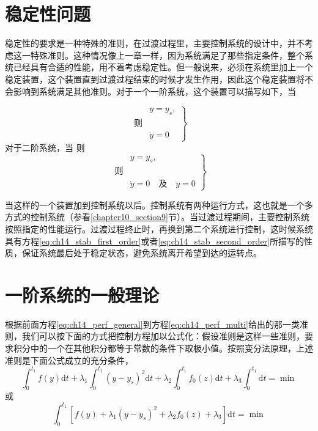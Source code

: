 \section{稳定性问题}

稳定性的要求是一种特殊的准则，在过渡过程里，主要控制系统的设计中，并不考虑这一特殊准则。这种情况像上一章一样，因为系统满足了那些指定条件，整个系统已经具有合适的性能，用不着考虑稳定性。但一般说来，必须在系统里加上一个稳定装置，这个装置直到过渡过程结束的时候才发生作用，因此这个稳定装置将不会影响到系统满足其他准则。对于一个一阶系统，这个装置可以描写如下，当

\begin{equation}
\left.
\begin{aligned}
&y = y_s, \\
\mbox{则}&\\
&\dot{y} = 0
\end{aligned}
\right\}
\label{eq:ch14_stab_first_order}
\end{equation}
对于二阶系统，当
则
\begin{equation}
\left.
\begin{aligned}
&y = y_s, \\
\mbox{则}&\\
&\dot{y} = 0 \quad \text{及} \quad \ddot{y} = 0
\end{aligned}
\right\}
\label{eq:ch14_stab_second_order}
\end{equation}

当这样的一个装置加到控制系统以后。控制系统有两种运行方式，这也就是一个多方式的控制系统（参看\ref{chapter10_section9}节）。当过渡过程期间，主要控制系统按照指定的性能运行。过渡过程终止时，再换到第二个系统进行控制，这时候系统具有方程\eqref{eq:ch14_stab_first_order}或者\eqref{eq:ch14_stab_second_order}所描写的性质，保证系统最后处于稳定状态，避免系统离开希望到达的运转点。

\section{一阶系统的一般理论}

根据前面方程\eqref{eq:ch14_perf_general}到方程\eqref{eq:ch14_perf_multi}给出的那一类准则，我们可以按下面的方式把控制方程加以公式化：假设准则是这样一些准则，要求积分中的一个在其他积分都等于常数的条件下取极小值。按照变分法原理，上述准则是下面公式成立的充分条件，
\begin{equation*}
\int_{0}^{t_1} f(y) \mathrm{d}t + \lambda_1 \int_{0}^{t_1} (y - y_s)^2 \mathrm{d}t + \lambda_2 \int_{0}^{t_1} f_0(z) \mathrm{d}t + \lambda_3 \int_{0}^{t_1} \mathrm{d}t = \min
\end{equation*}
或
\begin{equation}
\int_{0}^{t_1} \left[ f(y) + \lambda_1 (y - y_s)^2 + \lambda_2 f_0(z) + \lambda_3 \right] \mathrm{d}t = \min
\label{eq:ch14_lambda_multiplier}
\end{equation}

